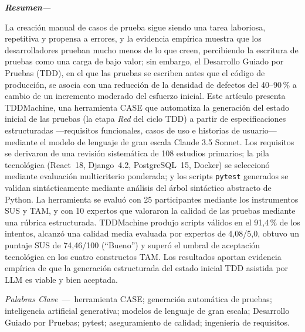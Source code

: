 \documentclass[10pt,journal,twoside,letterpaper]{IEEEtran}
\renewcommand{\figurename}{Fig.}%
\renewcommand{\tablename}{TABLE}%
\renewcommand{\refname}{References}%
\renewcommand{\bibname}{References}%
\newenvironment{resumen}{%
	\vspace{0.3em}
	\noindent\normalfont\small\itshape\textbf{Resumen}\hspace{0.5em}\textmd{---}\hspace{0.3em}%
	\ignorespaces
}{%
	\par\vspace{0.3em}%
}
\newcommand{\palabrasclave}[1]{%
	\vspace{0.2em}
	\noindent\small\textit{Palabras Clave}~---~#1
	\par\vspace{0.4em}
}
\begin{document}
	\begin{resumen}
		La creación manual de casos de prueba sigue siendo una tarea laboriosa, repetitiva y propensa a errores, y la evidencia empírica muestra que los desarrolladores prueban mucho menos de lo que creen, percibiendo la escritura de pruebas como una carga de bajo valor; sin embargo, el Desarrollo Guiado por Pruebas (TDD), en el que las pruebas se escriben antes que el código de producción, se asocia con una reducción de la densidad de defectos del 40--90\,\% a cambio de un incremento moderado del esfuerzo inicial. Este artículo presenta TDDMachine, una herramienta CASE que automatiza la generación del estado inicial de las pruebas (la etapa \emph{Red} del ciclo TDD) a partir de especificaciones estructuradas ---requisitos funcionales, casos de uso e historias de usuario--- mediante el modelo de lenguaje de gran escala Claude 3.5 Sonnet. Los requisitos se derivaron de una revisión sistemática de 108 estudios primarios; la pila tecnológica (React~18, Django~4.2, PostgreSQL~15, Docker) se seleccionó mediante evaluación multicriterio ponderada; y los scripts \texttt{pytest} generados se validan sintácticamente mediante análisis del árbol sintáctico abstracto de Python. La herramienta se evaluó con 25 participantes mediante los instrumentos SUS y TAM, y con 10 expertos que valoraron la calidad de las pruebas mediante una rúbrica estructurada. TDDMachine produjo scripts válidos en el 91,4\,\% de los intentos, alcanzó una calidad media evaluada por expertos de 4,08/5,0, obtuvo un puntaje SUS de 74,46/100 (``Bueno'') y superó el umbral de aceptación tecnológica en los cuatro constructos TAM. Los resultados aportan evidencia empírica de que la generación estructurada del estado inicial TDD asistida por LLM es viable y bien aceptada.
	\end{resumen}

	\palabrasclave{herramienta CASE; generación automática de pruebas; inteligencia artificial generativa; modelos de lenguaje de gran escala; Desarrollo Guiado por Pruebas; pytest; aseguramiento de calidad; ingeniería de requisitos.}

	\renewcommand{\figurename}{Fig.}
	\renewcommand{\tablename}{TABLE}
	\renewcommand{\refname}{References}
	\renewcommand{\bibname}{References}

\end{document}
